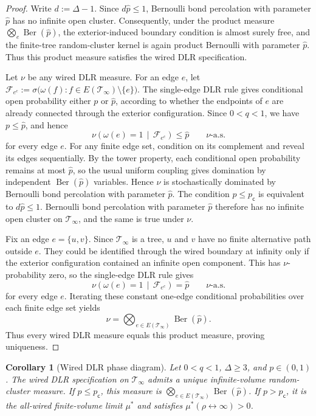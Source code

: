\documentclass[11pt]{amsart}
\theoremstyle{plain}
\newtheorem{corollary}[theorem]{Corollary}
\theoremstyle{definition}
\theoremstyle{remark}
\newcommand{\pc}{p_{\mathsf{c}}}
\begin{document}
\begin{proof}
Write $d:=\Delta-1$. Since $d\widehat p\le1$, Bernoulli bond percolation with parameter $\widehat p$ has no infinite open cluster. Consequently, under the product measure $\bigotimes_e\operatorname{Ber}(\widehat p)$, the exterior-induced boundary condition is almost surely free, and the finite-tree random-cluster kernel is again product Bernoulli with parameter $\widehat p$. Thus this product measure satisfies the wired DLR specification.

Let $\nu$ be any wired DLR measure. For an edge $e$, let $\mathcal F_{e^c}:=\sigma\bigl(\omega(f):f\in E(\mathcal T_\infty)\setminus\{e\}\bigr)$. The single-edge DLR rule gives conditional open probability either $p$ or $\widehat p$, according to whether the endpoints of $e$ are already connected through the exterior configuration. Since $0<q<1$, we have $p\le\widehat p$, and hence
\[
    \nu\left(
        \omega(e)=1
        \,\middle|\,
        \mathcal F_{e^c}
    \right)
    \le
    \widehat p
    \qquad
    \nu\text{-a.s.}
\]
for every edge $e$. For any finite edge set, condition on its complement and reveal its edges sequentially. By the tower property, each conditional open probability remains at most $\widehat p$, so the usual uniform coupling gives domination by independent $\operatorname{Ber}(\widehat p)$ variables. Hence $\nu$ is stochastically dominated by Bernoulli bond percolation with parameter $\widehat p$. The condition $p\le\pc$ is equivalent to $d\widehat p\le1$. Bernoulli bond percolation with parameter $\widehat p$ therefore has no infinite open cluster on $\mathcal T_\infty$, and the same is true under $\nu$. 

Fix an edge $e=\{u,v\}$. Since $\mathcal T_\infty$ is a tree, $u$ and $v$ have no finite alternative path outside $e$. They could be identified through the wired boundary at infinity only if the exterior configuration contained an infinite open component. This has $\nu$-probability zero, so the single-edge DLR rule gives
\[
    \nu\left(
        \omega(e)=1
        \,\middle|\,
        \mathcal F_{e^c}
    \right)
    =
    \widehat p
    \qquad
    \nu\text{-a.s.}
\]
for every edge $e$. Iterating these constant one-edge conditional probabilities over each finite edge set yields
\[
    \nu
    =
    \bigotimes_{e\in E(\mathcal T_\infty)}
    \operatorname{Ber}(\widehat p).
\]
Thus every wired DLR measure equals this product measure, proving uniqueness.
\end{proof}

\begin{corollary}[Wired DLR phase diagram]
\label{cor:wired-dlr-phase-diagram}
Let $0<q<1$, $\Delta\ge3$, and $p\in(0,1)$. The wired DLR specification on $\mathcal T_\infty$ admits a unique infinite-volume random-cluster measure. If $p\le\pc$, this measure is $\bigotimes_{e\in E(\mathcal T_\infty)}\operatorname{Ber}(\widehat p)$. If $p>\pc$, it is the all-wired finite-volume limit $\mu^*$ and satisfies $\mu^*(\rho\leftrightarrow\infty)>0$.
\end{corollary}
\end{document}
